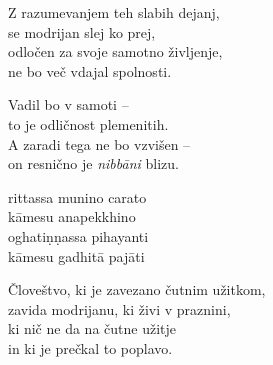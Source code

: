 Z razumevanjem teh slabih dejanj,\\
se modrijan slej ko prej,\\
odločen za svoje samotno življenje,\\
ne bo več vdajal spolnosti.

Vadil bo v samoti --\\
to je odličnost plemenitih.\\
A zaradi tega ne bo vzvišen --\\
on resnično je \emph{nibbāni} blizu.


\clearpage

rittassa munino carato\\
kāmesu anapekkhino\\
oghatiṇṇassa pihayanti\\
kāmesu gadhitā pajāti


\clearpage

Človeštvo, ki je zavezano čutnim užitkom,\\
zavida modrijanu, ki živi v praznini,\\
ki nič ne da na čutne užitje\\
in ki je prečkal to poplavo.

